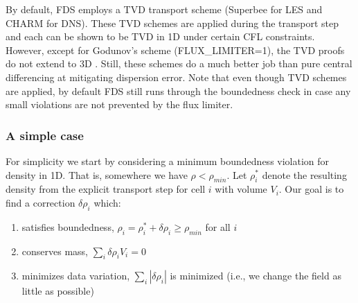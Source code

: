 By default, FDS employs a TVD transport scheme (Superbee \cite{Roe:1986} for LES and CHARM \cite{Zhou:1995} for DNS). These TVD schemes are applied during the transport step and each can be shown to be TVD in 1D under certain CFL constraints.  However, except for Godunov's scheme ({\ct FLUX\_LIMITER=1}), the TVD proofs do not extend to 3D \cite{Toro}.  Still, these schemes do a much better job than pure central differencing at mitigating dispersion error.  Note that even though TVD schemes are applied, by default FDS still runs through the boundedness check in case any small violations are not prevented by the flux limiter.

\subsubsection{A simple case}

For simplicity we start by considering a minimum boundedness violation for density in 1D.  That is, somewhere we have $\rho < \rho_{min}$.  Let $\rho_i^*$ denote the resulting density from the explicit transport step for cell $i$ with volume $V_i$.  Our goal is to find a correction $\delta \rho_i$ which:
\begin{enumerate}[{(}a{)}]
\item satisfies boundedness, $\rho_i = \rho_i^* + \delta \rho_i \ge \rho_{min}$ for all $i$
\item conserves mass, $\sum_i \delta \rho_i V_i = 0$
\item minimizes data variation, $\sum_i |\delta \rho_i|$ is minimized (i.e., we change the field as little as possible)
\end{enumerate}

